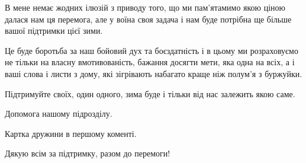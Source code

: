 В мене немає жодних ілюзій з приводу того, що ми пам’ятамимо якою ціною
далася нам ця перемога, але у воїна своя задача і нам буде потрібна ще більше
вашої підтримки цієї зими. 

Це буде боротьба за наш бойовий дух та боєздатність і в цьому ми розраховуємо
не тільки на власну вмотивованість, бажання досягти мети, яка одна на всіх, а
і ваші слова і листи  з дому, які зігрівають набагато краще ніж полум’я з
буржуйки.

Підтримуйте своїх, один одного, зима буде і тільки від нас залежить якою
саме.

Допомога нашому підрозділу.

Картка дружини в першому коменті.

Дякую всім за підтримку, разом до перемоги!
